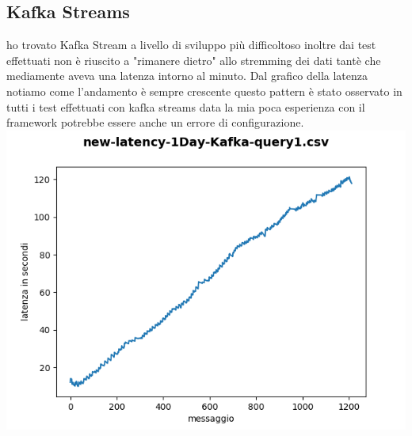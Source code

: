 \documentclass[acmsmall]{acmart}
\begin{document}
\subsection{Kafka Streams}
ho trovato Kafka Stream a livello di sviluppo più difficoltoso inoltre dai test effettuati non è riuscito a "rimanere dietro" allo stremming dei dati tantè che mediamente aveva una latenza intorno al minuto.
Dal grafico della latenza notiamo come l'andamento è sempre crescente 
questo pattern è stato osservato in tutti i test effettuati con kafka streams data la mia poca esperienza con il framework potrebbe essere anche un errore di configurazione. \\
\includegraphics[width=14cm]{../results/tempi/new-latency-1Day-Kafka-query1.csv.png}

 
\end{document}
